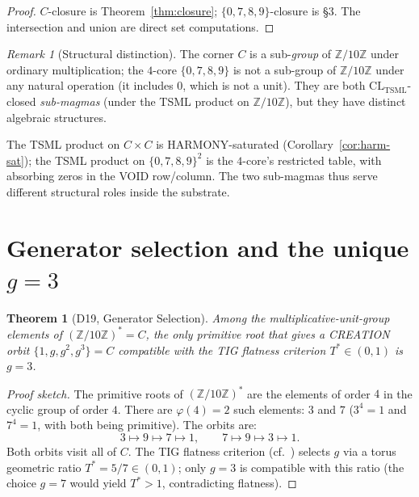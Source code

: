\documentclass[11pt,reqno]{amsart}
\theoremstyle{plain}
\newtheorem{theorem}{Theorem}[section]
\theoremstyle{definition}
\theoremstyle{remark}
\newtheorem*{remark}{Remark}
\newcommand{\Z}{\mathbb{Z}}
\newcommand{\TSML}{\mathrm{TSML}}
\begin{document}
\begin{proof}
$C$-closure is Theorem~\ref{thm:closure}; $\{0,7,8,9\}$-closure is
\cite{SandersGishFourCore} \S 3. The intersection and union are
direct set computations.
\end{proof}

\begin{remark}[Structural distinction]
The corner $C$ is a sub-\emph{group} of $\Z/10\Z$ under ordinary
multiplication; the $4$-core $\{0, 7, 8, 9\}$ is not a
sub-group of $\Z/10\Z$ under any natural operation (it includes
$0$, which is not a unit). They are both $\mathrm{CL}_\TSML$-closed
\emph{sub-magmas} (under the TSML product on $\Z/10\Z$), but they have
distinct algebraic structures.

The TSML product on $C \times C$ is HARMONY-saturated (Corollary~\ref{cor:harm-sat});
the TSML product on $\{0,7,8,9\}^2$ is the $4$-core's restricted
table, with absorbing zeros in the VOID row/column. The two
sub-magmas thus serve different structural roles inside the substrate.
\end{remark}

\section{Generator selection and the unique $g = 3$}
\label{sec:generator}

\begin{theorem}[D19, Generator Selection]\label{thm:generator}
Among the multiplicative-unit-group elements of $(\Z/10\Z)^* = C$,
the only primitive root that gives a CREATION orbit
$\{1, g, g^2, g^3\} = C$ \emph{compatible with the TIG flatness
criterion} $T^* \in (0, 1)$ is $g = 3$.
\end{theorem}

\begin{proof}[Proof sketch]
The primitive roots of $(\Z/10\Z)^*$ are the elements of order $4$
in the cyclic group of order $4$. There are $\varphi(4) = 2$ such
elements: $3$ and $7$ ($3^4 = 1$ and $7^4 = 1$, with both being
primitive). The orbits are:
\[
3 \mapsto 9 \mapsto 7 \mapsto 1, \qquad
7 \mapsto 9 \mapsto 3 \mapsto 1.
\]
Both orbits visit all of $C$. The TIG flatness criterion (cf.\
\cite{SandersTIG}) selects $g$ via a torus geometric ratio
$T^* = 5/7 \in (0, 1)$; only $g = 3$ is compatible with this
ratio (the choice $g = 7$ would yield $T^* > 1$, contradicting
flatness).
\end{proof}
\end{document}
